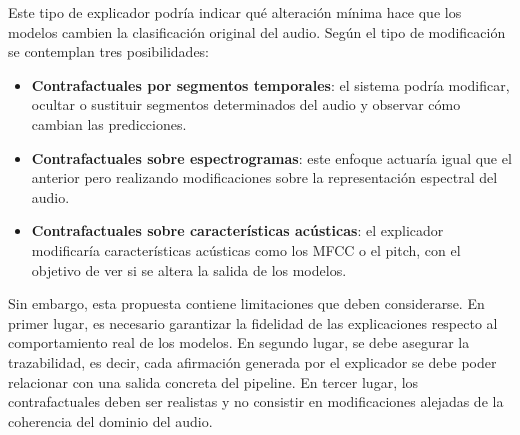 Este tipo de explicador podría indicar qué alteración mínima hace que los modelos cambien la clasificación original del audio. Según el tipo de modificación se contemplan tres posibilidades: 
\begin{itemize}
    \item \textbf{Contrafactuales por segmentos temporales}: el sistema podría modificar, ocultar o sustituir segmentos determinados del audio y observar cómo cambian las predicciones.
    \item \textbf{Contrafactuales sobre espectrogramas}: este enfoque actuaría igual que el anterior pero realizando modificaciones sobre la representación espectral del audio.
    \item \textbf{Contrafactuales sobre características acústicas}: el explicador modificaría características acústicas como los MFCC o el pitch, con el objetivo de ver si se altera la salida de los modelos.
\end{itemize}

Sin embargo, esta propuesta contiene limitaciones que deben considerarse. En primer lugar, es necesario garantizar la fidelidad de las explicaciones respecto al comportamiento real de los modelos. En segundo lugar, se debe asegurar la trazabilidad, es decir, cada afirmación generada por el explicador se debe poder relacionar con una salida concreta del pipeline. En tercer lugar, los contrafactuales deben ser realistas y no consistir en modificaciones alejadas de la coherencia del dominio del audio.